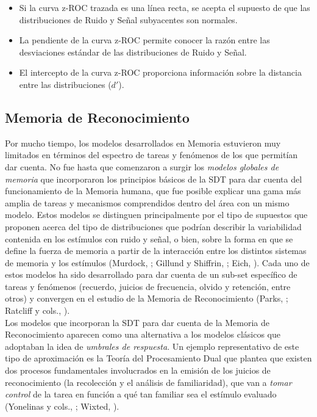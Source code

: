 \begin{enumerate}
\begin{itemize}
\item Si la curva z-ROC trazada es una línea recta, se acepta el supuesto de que las distribuciones de Ruido y Señal subyacentes son normales.\\
\item La pendiente de la curva z-ROC permite conocer la razón entre las desviaciones estándar de las distribuciones de Ruido y Señal.\\
\item El intercepto de la curva z-ROC proporciona información sobre la distancia entre las distribuciones ($d'$).\\
\end{itemize}

\end{enumerate} 

\subsection{ Memoria de Reconocimiento}

Por mucho tiempo, los modelos desarrollados en Memoria estuvieron muy limitados en términos del espectro de tareas y fenómenos de los que permitían dar cuenta. No fue hasta que comenzaron a surgir los \textit{modelos globales de memoria} que incorporaron los principios básicos de la SDT para dar cuenta del funcionamiento de la Memoria humana, que fue posible explicar una gama más amplia de tareas y mecanismos comprendidos dentro del área con un mismo modelo. Estos modelos se distinguen principalmente por el tipo de supuestos que proponen acerca del tipo de distribuciones que podrían describir la variabilidad contenida en los estímulos con ruido y señal, o bien, sobre la forma en que se define la fuerza de memoria a partir de la interacción entre los distintos sistemas de memoria y los estímulos (Murdock, \citeyear{Murdock1982}; Gillund y Shiffrin, \citeyear{Gillund1984}; Eich, \citeyear{Eich1985}). Cada uno de estos modelos ha sido desarrollado para dar cuenta de un sub-set específico de tareas y fenómenos (recuerdo, juicios de frecuencia, olvido y retención, entre otros) y convergen en el estudio de la Memoria de Reconocimiento (Parks, \citeyear{Parks1966}; Ratcliff y cols., \citeyear{Ratcliff1992}).\\

Los modelos que incorporan la SDT para dar cuenta de la Memoria de Reconocimiento aparecen como una alternativa a los modelos clásicos que adoptaban la idea de \textit{umbrales de respuesta}. Un ejemplo representativo de este tipo de aproximación es la Teoría del Procesamiento Dual que plantea que existen dos procesos fundamentales involucrados en la emisión de los juicios de reconocimiento (la recolección y el análisis de familiaridad), que van a \textit{tomar control} de la tarea en función a qué tan familiar sea el estímulo evaluado (Yonelinas y cols., \citeyear{Yonelinas1996}; Wixted, \citeyear{Wixted2007}).\\

